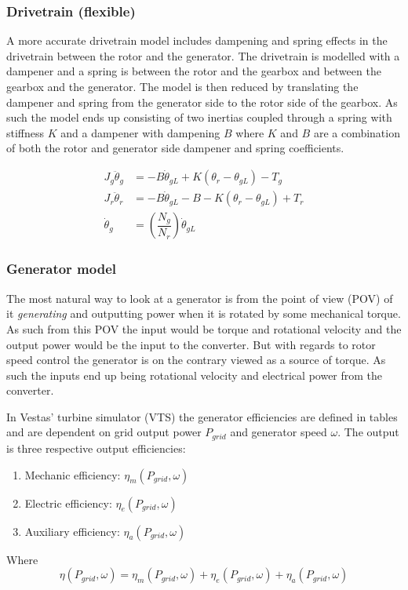 \subsubsection{Drivetrain (flexible)}
A more accurate drivetrain model includes dampening and spring effects in the drivetrain between the rotor and the generator. The drivetrain is modelled with a dampener and a spring is between the rotor and the gearbox and between the gearbox and the generator. The model is then reduced by translating the dampener and spring from the generator side to the rotor side of the gearbox. As such the model ends up consisting of two inertias coupled through a spring with stiffness $ K $ and a dampener with dampening $ B $ where $ K $ and $ B $ are a combination of both the rotor and generator side dampener and spring coefficients. 

\begin{align} \label{eq:wtlin_comp_drivetrain_flex}
	J_{g} \ddot{\theta}_g & = -B \dot{\theta}_{gL} + K(\theta_r - \theta_{gL}) - T_{g} \\
	J_{r} \ddot{\theta}_r & = -B \dot{\theta}_{gL} -B - K(\theta_r - \theta_{gL}) + T_{r} \\
	\dot{\theta}_g & = \left(\dfrac{N_g}{N_r}\right) \dot{\theta}_{gL}
\end{align}

\clearpage \newpage
\subsubsection{Generator model}
The most natural way to look at a generator is from the point of view (POV) of it \textit{generating} and outputting power when it is rotated by some mechanical torque. As such from this POV the input would be torque and rotational velocity and the output power would be the input to the converter. But with regards to rotor speed control the generator is on the contrary viewed as a source of torque. As such the inputs end up being rotational velocity and electrical power from the converter.

In Vestas' turbine simulator (VTS) the generator efficiencies are defined in tables and are dependent on grid output power $ P_{grid} $ and generator speed $ \omega $. The output is three respective output efficiencies: 
\begin{enumerate}
	\item Mechanic efficiency: $ \eta_m(P_{grid},\omega) $
	\item Electric efficiency: $ \eta_e(P_{grid},\omega) $
	\item Auxiliary efficiency: $ \eta_a(P_{grid},\omega) $
\end{enumerate}
Where 
\begin{equation}\label{eq:wtLin_gen_effi}
	\eta(P_{grid},\omega) = \eta_m(P_{grid},\omega) + \eta_e(P_{grid},\omega) + \eta_a(P_{grid},\omega)
\end{equation}


